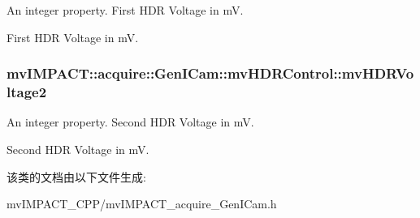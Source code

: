 An integer property. First H\+D\+R Voltage in m\+V. 

First H\+D\+R Voltage in m\+V. \hypertarget{classmv_i_m_p_a_c_t_1_1acquire_1_1_gen_i_cam_1_1mv_h_d_r_control_a5252640d82422084786ff3cf3851f0ad}{
\subsubsection[{mv\+H\+D\+R\+Voltage2}]{ mv\+I\+M\+P\+A\+C\+T\+::acquire\+::\+Gen\+I\+Cam\+::mv\+H\+D\+R\+Control\+::mv\+H\+D\+R\+Voltage2}}\label{classmv_i_m_p_a_c_t_1_1acquire_1_1_gen_i_cam_1_1mv_h_d_r_control_a5252640d82422084786ff3cf3851f0ad}


An integer property. Second H\+D\+R Voltage in m\+V. 

Second H\+D\+R Voltage in m\+V. 

该类的文档由以下文件生成\+:\begin{DoxyCompactItemize}
\item 
mv\+I\+M\+P\+A\+C\+T\+\_\+\+C\+P\+P/mv\+I\+M\+P\+A\+C\+T\+\_\+acquire\+\_\+\+Gen\+I\+Cam.\+h\end{DoxyCompactItemize}
